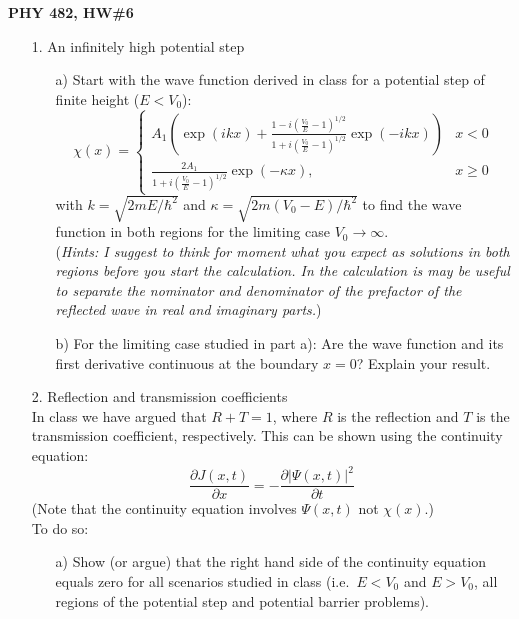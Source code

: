 \documentclass[11pt]{article}
\begin{document}
\thispagestyle{empty}


\centerline{\bf PHY 482,  HW\#6}

\begin{itemize}
%
\item[1.] An infinitely high potential step
\begin{itemize}
\item[a)]
Start with the wave function derived in class for a potential step of finite height ($E<V_0$):
\begin{displaymath}
\chi(x) =
\begin{cases}
A_1\left(\exp(ikx) + \frac{1-i\left(\frac{V_0}{E}-1\right)^{1/2}}{1+i\left(\frac{V_0}{E}-1\right)^{1/2}}\exp(-ikx)\right) &x<0\\
\frac{2A_1}{1+i\left(\frac{V_0}{E}-1\right)^{1/2}}\exp(-\kappa x), &x \ge 0
\end{cases}
\end{displaymath}
with $k = \sqrt{2mE/\hbar^2}$ and $\kappa = \sqrt{2m(V_0-E)/\hbar^2}$
to find the wave function in both regions for the limiting case $V_0 \rightarrow \infty$.\\
({\it Hints: I suggest to think for moment what you expect as solutions in both regions before you start the calculation. In the calculation is may be useful to separate the nominator and denominator of the prefactor of the reflected wave in real and imaginary parts.})
\item[b)] For the limiting case studied in part a): Are the wave function and its first derivative continuous at the boundary $x=0$? Explain your result.
\end{itemize}
%
\vspace*{0.5cm}
%
\item[2.] Reflection and transmission coefficients\\
In class we have argued that $R + T = 1$, where $R$ is the reflection and $T$ is the transmission coefficient, respectively. This can be shown using the continuity equation:
\begin{displaymath}
\frac{\partial J(x,t)}{\partial x} = -\frac{\partial |\Psi(x,t)|^2}{\partial t}
\end{displaymath}
(Note that the continuity equation involves $\Psi(x,t)$ not $\chi(x)$.)\\
To do so:
\begin{itemize}
\item[a)] Show (or argue) that the right hand side of the continuity equation equals zero for all scenarios studied in class (i.e.\ $E<V_0$ and $E>V_0$, all regions of the potential step and potential barrier problems).

\end{itemize}
\end{itemize}
\end{document}
